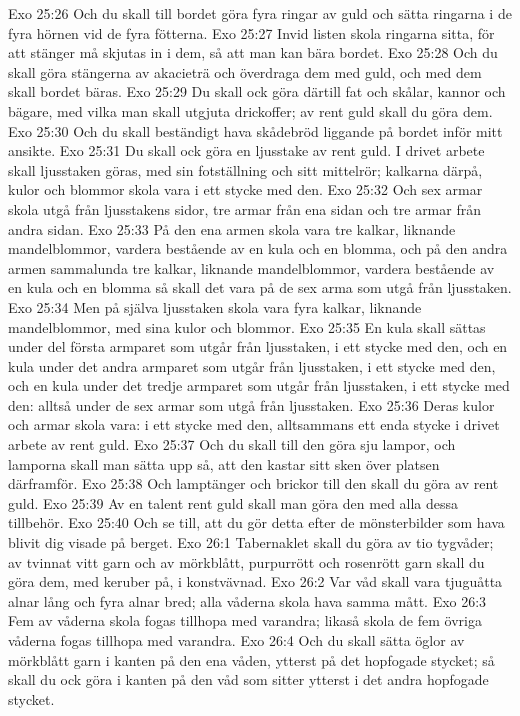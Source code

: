 Exo 25:26  Och du skall till bordet göra fyra ringar av guld och sätta ringarna i de fyra hörnen vid de fyra fötterna.
Exo 25:27  Invid listen skola ringarna sitta, för att stänger må skjutas in i dem, så att man kan bära bordet.
Exo 25:28  Och du skall göra stängerna av akacieträ och överdraga dem med guld, och med dem skall bordet bäras.
Exo 25:29  Du skall ock göra därtill fat och skålar, kannor och bägare, med vilka man skall utgjuta drickoffer; av rent guld skall du göra dem.
Exo 25:30  Och du skall beständigt hava skådebröd liggande på bordet inför mitt ansikte.
Exo 25:31  Du skall ock göra en ljusstake av rent guld. I drivet arbete skall ljusstaken göras, med sin fotställning och sitt mittelrör; kalkarna därpå, kulor och blommor skola vara i ett stycke med den.
Exo 25:32  Och sex armar skola utgå från ljusstakens sidor, tre armar från ena sidan och tre armar från andra sidan.
Exo 25:33  På den ena armen skola vara tre kalkar, liknande mandelblommor, vardera bestående av en kula och en blomma, och på den andra armen sammalunda tre kalkar, liknande mandelblommor, vardera bestående av en kula och en blomma så skall det vara på de sex arma som utgå från ljusstaken.
Exo 25:34  Men på själva ljusstaken skola vara fyra kalkar, liknande mandelblommor, med sina kulor och blommor.
Exo 25:35  En kula skall sättas under del första armparet som utgår från ljusstaken, i ett stycke med den, och en kula under det andra armparet som utgår från ljusstaken, i ett stycke med den, och en kula under det tredje armparet som utgår från ljusstaken, i ett stycke med den: alltså under de sex armar som utgå från ljusstaken.
Exo 25:36  Deras kulor och armar skola vara: i ett stycke med den, alltsammans ett enda stycke i drivet arbete av rent guld.
Exo 25:37  Och du skall till den göra sju lampor, och lamporna skall man sätta upp så, att den kastar sitt sken över platsen därframför.
Exo 25:38  Och lamptänger och brickor till den skall du göra av rent guld.
Exo 25:39  Av en talent rent guld skall man göra den med alla dessa tillbehör.
Exo 25:40  Och se till, att du gör detta efter de mönsterbilder som hava blivit dig visade på berget.
Exo 26:1  Tabernaklet skall du göra av tio tygvåder; av tvinnat vitt garn och av mörkblått, purpurrött och rosenrött garn skall du göra dem, med keruber på, i konstvävnad.
Exo 26:2  Var våd skall vara tjuguåtta alnar lång och fyra alnar bred; alla våderna skola hava samma mått.
Exo 26:3  Fem av våderna skola fogas tillhopa med varandra; likaså skola de fem övriga våderna fogas tillhopa med varandra.
Exo 26:4  Och du skall sätta öglor av mörkblått garn i kanten på den ena våden, ytterst på det hopfogade stycket; så skall du ock göra i kanten på den våd som sitter ytterst i det andra hopfogade stycket.
